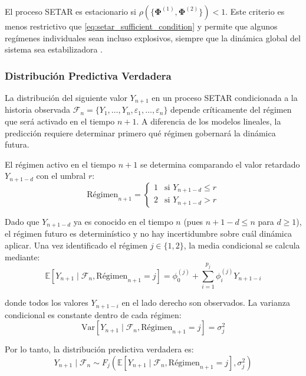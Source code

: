 El proceso SETAR es estacionario si $\rho(\{\boldsymbol{\Phi}^{(1)}, \boldsymbol{\Phi}^{(2)}\}) < 1$. Este criterio es menos restrictivo que \eqref{eq:setar_sufficient_condition} y permite que algunos regímenes individuales sean incluso explosivos, siempre que la dinámica global del sistema sea estabilizadora \parencite{Chen2023}.

\subsubsection{Distribución Predictiva Verdadera}

La distribución del siguiente valor $Y_{n+1}$ en un proceso SETAR condicionada a la historia observada $\mathcal{F}_n = \{Y_1, \ldots, Y_n, \varepsilon_1, \ldots, \varepsilon_n\}$ depende críticamente del régimen que será activado en el tiempo $n+1$. A diferencia de los modelos lineales, la predicción requiere determinar primero qué régimen gobernará la dinámica futura.

El régimen activo en el tiempo $n+1$ se determina comparando el valor retardado $Y_{n+1-d}$ con el umbral $r$:
\begin{equation}
\text{Régimen}_{n+1} = 
\begin{cases}
1 & \text{si } Y_{n+1-d} \leq r \\
2 & \text{si } Y_{n+1-d} > r
\end{cases}
\label{eq:setar_regime_determination}
\end{equation}

Dado que $Y_{n+1-d}$ ya es conocido en el tiempo $n$ (pues $n+1-d \leq n$ para $d \geq 1$), el régimen futuro es determinístico y no hay incertidumbre sobre cuál dinámica aplicar. Una vez identificado el régimen $j \in \{1, 2\}$, la media condicional se calcula mediante:
\begin{equation}
\mathbb{E}[Y_{n+1} \mid \mathcal{F}_n, \text{Régimen}_{n+1} = j] = \phi_0^{(j)} + \sum_{i=1}^{p_j} \phi_i^{(j)} Y_{n+1-i}
\label{eq:setar_conditional_mean}
\end{equation}

donde todos los valores $Y_{n+1-i}$ en el lado derecho son observados. La varianza condicional es constante dentro de cada régimen:
\begin{equation}
\text{Var}[Y_{n+1} \mid \mathcal{F}_n, \text{Régimen}_{n+1} = j] = \sigma_j^2
\label{eq:setar_conditional_variance}
\end{equation}

Por lo tanto, la distribución predictiva verdadera es:
\begin{equation}
Y_{n+1} \mid \mathcal{F}_n \sim F_j\left(\mathbb{E}[Y_{n+1} \mid \mathcal{F}_n, \text{Régimen}_{n+1} = j], \sigma_j^2\right)
\label{eq:setar_predictive_distribution}
\end{equation}

